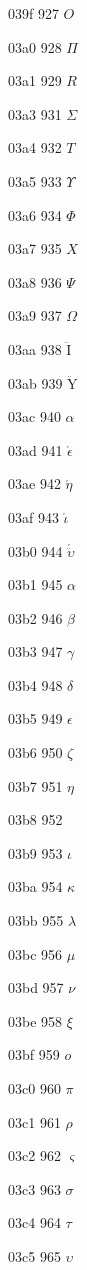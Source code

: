 \documentclass[11pt]{article}
\begin{document}
039f 927 \ensuremath{O}

03a0 928 \ensuremath{\Pi}

03a1 929 \ensuremath{{R}}

03a3 931 \ensuremath{\Sigma}

03a4 932 \ensuremath{{T}}

03a5 933 \ensuremath{\Upsilon}

03a6 934 \ensuremath{\Phi}

03a7 935 \ensuremath{{X}}

03a8 936 \ensuremath{\Psi}

03a9 937 \ensuremath{\Omega}

03aa 938 \ensuremath{\mathrm{\ddot{I}}}

03ab 939 \ensuremath{\mathrm{\ddot{Y}}}

03ac 940 \'{$\alpha$}

03ad 941 \ensuremath{\acute{\epsilon}}

03ae 942 \ensuremath{\acute{\eta}}

03af 943 \ensuremath{\acute{\iota}}

03b0 944 \ensuremath{\acute{\ddot{\upsilon}}}

03b1 945 \ensuremath{\alpha}

03b2 946 \ensuremath{\beta}

03b3 947 \ensuremath{\gamma}

03b4 948 \ensuremath{\delta}

03b5 949 \ensuremath{\epsilon}

03b6 950 \ensuremath{\zeta}

03b7 951 \ensuremath{\eta}

03b8 952 \texttheta

03b9 953 \ensuremath{\iota}

03ba 954 \ensuremath{\kappa}

03bb 955 \ensuremath{\lambda}

03bc 956 \ensuremath{\mu}

03bd 957 \ensuremath{\nu}

03be 958 \ensuremath{\xi}

03bf 959 \ensuremath{o}

03c0 960 \ensuremath{\pi}

03c1 961 \ensuremath{\rho}

03c2 962 \ensuremath{\varsigma}

03c3 963 \ensuremath{\sigma}

03c4 964 \ensuremath{\tau}

03c5 965 \ensuremath{\upsilon}
\end{document}
